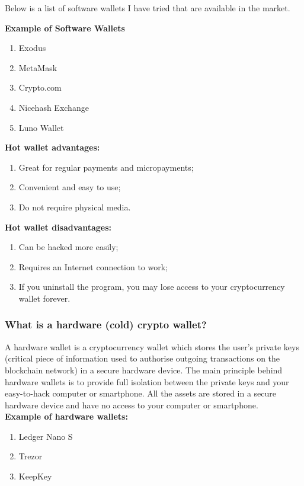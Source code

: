 Below is a list of software wallets I have tried that are available in the market.

\textbf{Example of Software Wallets}
\begin{enumerate}
\item Exodus
\item MetaMask
\item Crypto.com
\item Nicehash Exchange
\item Luno Wallet
\end{enumerate}

\textbf{Hot wallet advantages:}
    \begin{enumerate}
    \item Great for regular payments and micropayments;
    \item Convenient and easy to use;    
    \item Do not require physical media.
    \end{enumerate}
\textbf{Hot wallet disadvantages:}
    \begin{enumerate}
    \item Can be hacked more easily;
    \item Requires an Internet connection to work;
    \item If you uninstall the program, you may lose access to your cryptocurrency wallet forever.
    \end{enumerate}

\subsubsection{What is a hardware (cold) crypto wallet?}
A hardware wallet is a cryptocurrency wallet which stores the user's private keys (critical piece of information used to authorise outgoing transactions on the blockchain network) in a secure hardware device. The main principle behind hardware wallets is to provide full isolation between the private keys and your easy-to-hack computer or smartphone.
All the assets are stored in a secure hardware device and have no access to your computer or smartphone. \\

\textbf{Example of hardware wallets:}
\begin{enumerate}
\item Ledger Nano S
\item Trezor
\item KeepKey
\end{enumerate}

